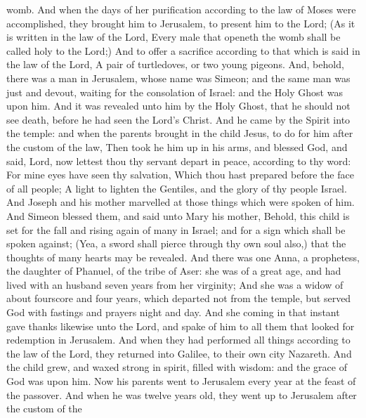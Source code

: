 womb.  And when the days of her purification according to
the law of Moses were accomplished, they brought him to Jerusalem, to
present him to the Lord;  (As it is written in the law of
the Lord, Every male that openeth the womb shall be called holy to the
Lord;)  And to offer a sacrifice according to that which
is said in the law of the Lord, A pair of turtledoves, or two young
pigeons.  And, behold, there was a man in Jerusalem,
whose name was Simeon; and the same man was just and devout, waiting for
the consolation of Israel: and the Holy Ghost was upon him.
 And it was revealed unto him by the Holy Ghost, that he
should not see death, before he had seen the Lord's Christ.
 And he came by the Spirit into the temple: and when the
parents brought in the child Jesus, to do for him after the custom of
the law,  Then took he him up in his arms, and blessed
God, and said,  Lord, now lettest thou thy servant depart
in peace, according to thy word:  For mine eyes have seen
thy salvation,  Which thou hast prepared before the face
of all people;  A light to lighten the Gentiles, and the
glory of thy people Israel.  And Joseph and his mother
marvelled at those things which were spoken of him.  And
Simeon blessed them, and said unto Mary his mother, Behold, this child
is set for the fall and rising again of many in Israel; and for a sign
which shall be spoken against;  (Yea, a sword shall
pierce through thy own soul also,) that the thoughts of many hearts may
be revealed.  And there was one Anna, a prophetess, the
daughter of Phanuel, of the tribe of Aser: she was of a great age, and
had lived with an husband seven years from her virginity;
 And she was a widow of about fourscore and four years,
which departed not from the temple, but served God with fastings and
prayers night and day.  And she coming in that instant
gave thanks likewise unto the Lord, and spake of him to all them that
looked for redemption in Jerusalem.  And when they had
performed all things according to the law of the Lord, they returned
into Galilee, to their own city Nazareth.  And the child
grew, and waxed strong in spirit, filled with wisdom: and the grace of
God was upon him.  Now his parents went to Jerusalem
every year at the feast of the passover.  And when he was
twelve years old, they went up to Jerusalem after the custom of the
